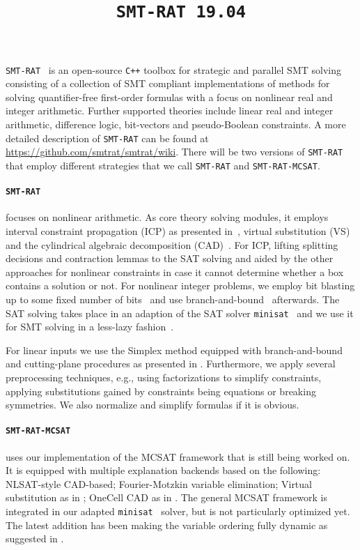 \documentclass{article}
\title{\texttt{SMT-RAT 19.04}}
\begin{document}
\maketitle

\texttt{SMT-RAT}~\cite{Corzilius2015} is an open-source \texttt{C++} toolbox for strategic and parallel SMT solving
consisting of a collection of SMT compliant implementations of methods for
solving quantifier-free first-order formulas with a focus on nonlinear real and integer arithmetic.
Further supported theories include linear real and integer arithmetic, difference logic, bit-vectors and pseudo-Boolean constraints.
A more detailed description of \texttt{SMT-RAT} can be found at \href{https://github.com/smtrat/smtrat/wiki}{\color{blue}https://github.com/smtrat/smtrat/wiki}.
There will be two versions of \texttt{SMT-RAT} that employ different strategies that we call \texttt{SMT-RAT} and \texttt{SMT-RAT-MCSAT}.

\paragraph{\texttt{SMT-RAT}} focuses on nonlinear arithmetic.
As core theory solving modules, it employs interval constraint propagation (ICP) as presented in~\cite{GGIGSC10}, virtual substitution (VS)~\cite{Article_Corzilius_FCT2011} and the cylindrical algebraic decomposition (CAD)~\cite{Loup2013}. For ICP, lifting splitting decisions and contraction lemmas to the SAT solving and aided by the other approaches for nonlinear constraints in case it cannot determine whether a box contains a solution or not. For nonlinear integer problems, we employ bit blasting up to some fixed number of bits~\cite{kruger2015bitvectors} and use branch-and-bound~\cite{Kremer2016} afterwards.
The SAT solving takes place in an adaption of the SAT solver \texttt{minisat}~\cite{Een2003} and we use it for SMT solving in a less-lazy fashion~\cite{sebastiani2007lazy}.

For linear inputs we use the Simplex method equipped with branch-and-bound and cutting-plane procedures as presented in \cite{DM06}.
Furthermore, we apply several preprocessing techniques, e.g., using factorizations to simplify constraints, applying substitutions gained by constraints being equations or breaking symmetries. We also normalize and simplify formulas if it is obvious.

\paragraph{\texttt{SMT-RAT-MCSAT}} uses our implementation of the MCSAT framework \cite{Moura2013} that is still being worked on.
It is equipped with multiple explanation backends based on the following: NLSAT-style CAD-based; Fourier-Motzkin variable elimination; Virtual substitution as in \cite{Abraham2017}; OneCell CAD as in \cite{Neuss2018}.
The general MCSAT framework is integrated in our adapted \texttt{minisat}~\cite{Een2003} solver, but is not particularly optimized yet.
The latest addition has been making the variable ordering fully dynamic as suggested in \cite{Jovanovic2013}.
\end{document}
